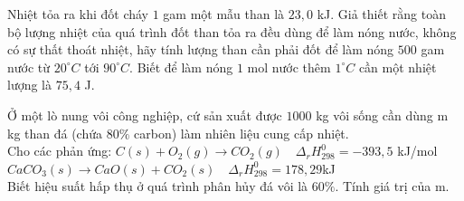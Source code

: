 \documentclass[Main.tex]{subfiles}
\begin{document}
	\begin{bt}[][CD – SBT] Nhiệt tỏa ra khi đốt cháy $1$ gam một mẫu than là $23{,}0$ kJ. Giả thiết rằng toàn bộ lượng nhiệt của quá trình đốt than tỏa ra đều dùng để làm nóng nước, không có sự thất thoát nhiệt, hãy tính lượng than cần phải đốt để làm nóng $500$ gam nước từ $20^\circ C$ tới $90^\circ C$. Biết để làm nóng $1$ mol nước thêm $1^\circ C$ cần một nhiệt lượng là $75{,}4$ J.
	\end{bt}
	\begin{bt}
		Ở một lò nung vôi công nghiệp, cứ sản xuất được $1000$ kg vôi sống cần dùng m kg than đá (chứa $80\%$ carbon) làm nhiên liệu cung cấp nhiệt.
		\\
		Cho các phản ứng: $C(s)+O_2(g) \longrightarrow CO_2(g) \quad \Delta_r H_{298}^0 = -393{,}5$ kJ/mol
		\\
		$CaCO_3(s) \longrightarrow CaO(s)+CO_2(s) \quad \Delta_r H_{298}^0 =178{,}29$kJ
		\\
		Biết hiệu suất hấp thụ ở quá trình phân hủy đá vôi là $60\%$. Tính giá trị của m.
	\end{bt}
\end{document}
